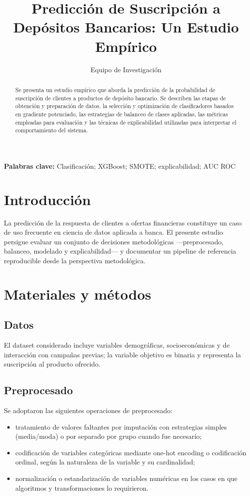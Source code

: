 \documentclass[12pt,a4paper]{article}
\title{Predicci\'on de Suscripci\'on a Dep\'ositos Bancarios: Un Estudio Emp\'irico}
\author{Equipo de Investigaci\'on}
\date{}
\begin{document}
\maketitle

\begin{abstract}
Se presenta un estudio emp\'irico que aborda la predicci\'on de la probabilidad de suscripci\'on de clientes a productos de dep\'osito bancario. Se describen las etapas de obtenci\'on y preparaci\'on de datos, la selecci\'on y optimizaci\'on de clasificadores basados en gradiente potenciado, las estrategias de balanceo de clases aplicadas, las m\'etricas empleadas para evaluaci\'on y las t\'ecnicas de explicabilidad utilizadas para interpretar el comportamiento del sistema.
\end{abstract}

\noindent\textbf{Palabras clave:} Clasificaci\'on; XGBoost; SMOTE; explicabilidad; AUC ROC

\section{Introducci\'on}
La predicci\'on de la respuesta de clientes a ofertas financieras constituye un caso de uso frecuente en ciencia de datos aplicada a banca. El presente estudio persigue evaluar un conjunto de decisiones metodol\'ogicas —preprocesado, balanceo, modelado y explicabilidad— y documentar un pipeline de referencia reproducible desde la perspectiva metodol\'ogica.

\section{Materiales y m\'etodos}
\subsection{Datos}
El dataset considerado incluye variables demogr\'aficas, socioecon\'omicas y de interacci\'on con campa\~nas previas; la variable objetivo es binaria y representa la suscripci\'on al producto ofrecido.

\subsection{Preprocesado}
Se adoptaron las siguientes operaciones de preprocesado:
\begin{itemize}[leftmargin=*]
  \item tratamiento de valores faltantes por imputaci\'on con estrategias simples (media/moda) o por separado por grupo cuando fue necesario;
  \item codificaci\'on de variables categ\'oricas mediante one-hot encoding o codificaci\'on ordinal, seg\'un la naturaleza de la variable y su cardinalidad;
  \item normalizaci\'on o estandarizaci\'on de variables num\'ericas en los casos en que algoritmos y transformaciones lo requirieron.
\end{itemize}
\end{document}
